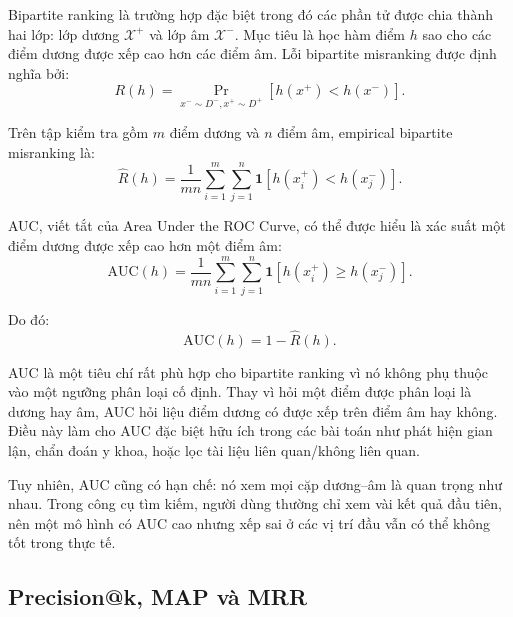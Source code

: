 Bipartite ranking là trường hợp đặc biệt trong đó các phần tử được chia thành hai lớp: lớp dương \(\mathcal{X}^{+}\) và lớp âm \(\mathcal{X}^{-}\). Mục tiêu là học hàm điểm \(h\) sao cho các điểm dương được xếp cao hơn các điểm âm. Lỗi bipartite misranking được định nghĩa bởi:
\begin{equation}
    R(h)
    =
    \Pr_{x^- \sim D^-, x^+ \sim D^+}
    \left[
        h(x^+) < h(x^-)
    \right].
    \label{eq:discussion-bipartite-misranking}
\end{equation}

Trên tập kiểm tra gồm \(m\) điểm dương và \(n\) điểm âm, empirical bipartite misranking là:
\begin{equation}
    \widehat{R}(h)
    =
    \frac{1}{mn}
    \sum_{i=1}^{m}
    \sum_{j=1}^{n}
    \mathbf{1}
    \left[
        h(x_i^+) < h(x_j^-)
    \right].
    \label{eq:discussion-empirical-bipartite-misranking}
\end{equation}

AUC, viết tắt của Area Under the ROC Curve, có thể được hiểu là xác suất một điểm dương được xếp cao hơn một điểm âm:
\begin{equation}
    \text{AUC}(h)
    =
    \frac{1}{mn}
    \sum_{i=1}^{m}
    \sum_{j=1}^{n}
    \mathbf{1}
    \left[
        h(x_i^+) \geq h(x_j^-)
    \right].
    \label{eq:discussion-auc-definition}
\end{equation}

Do đó:
\begin{equation}
    \text{AUC}(h) = 1 - \widehat{R}(h).
    \label{eq:discussion-auc-one-minus-ranking-loss}
\end{equation}

AUC là một tiêu chí rất phù hợp cho bipartite ranking vì nó không phụ thuộc vào một ngưỡng phân loại cố định. Thay vì hỏi một điểm được phân loại là dương hay âm, AUC hỏi liệu điểm dương có được xếp trên điểm âm hay không. Điều này làm cho AUC đặc biệt hữu ích trong các bài toán như phát hiện gian lận, chẩn đoán y khoa, hoặc lọc tài liệu liên quan/không liên quan.

Tuy nhiên, AUC cũng có hạn chế: nó xem mọi cặp dương--âm là quan trọng như nhau. Trong công cụ tìm kiếm, người dùng thường chỉ xem vài kết quả đầu tiên, nên một mô hình có AUC cao nhưng xếp sai ở các vị trí đầu vẫn có thể không tốt trong thực tế.

\subsection{Precision@k, MAP và MRR}

